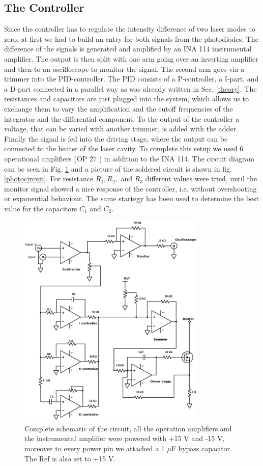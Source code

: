 \documentclass[a4paper,10pt]{article}
\begin{document}
\subsection{The Controller}
Since the controller has to regulate the intensity difference of two laser modes to zero, at first we had to build an entry for both signals from the photodiodes. The difference of the signals is generated and amplified by an INA 114 \cite{ina114} instrumental amplifier. The output is then split with one arm going over an inverting amplifier and then to an oscilloscope to monitor the signal. The second arm goes via a trimmer into the PID-controller.
\newline
The PID consists of a P-controller, a I-part, and a D-part connected in a parallel way as was already written in Sec. \ref{theory}. The resistances and capacitors are just plugged into the system, which allows us to exchange them to vary the amplification and the cutoff frequencies of the integrator and the differential component. To the output of the controller a  voltage, that can be varied with another trimmer, is added with the adder. Finally the signal is fed into the driving stage, where the output can be connected to the heater of the laser cavity. To complete this setup we used 6 operational amplifiers (OP 27 \cite{op27}) in addition to the INA 114. The circuit diagram can be seen in Fig. \ref{circuit} and a picture of the soldered circuit is shown in fig. \ref{photocircuit}.
For resistance $R_1,R_2,$ and $R_3$ different values were tried, until the monitor signal showed a nice response of the controller, i.e. without overshooting or exponential behaviour. The same startegy has been used to determine the best value for the capacitors $C_1$ and $C_2$.
\begin{figure}[H]
\centering
\includegraphics[width=0.8\textwidth]{circuit}
\caption{Complete schematic of the circuit, all the operation amplifiers and the instrumental amplifier were powered with +15 V and -15 V, moreover to every power pin we attached a 1 $\mu$F bypass capacitor. The Ref is also set to +15 V.}\label{circuit}
\end{figure}
\end{document}
